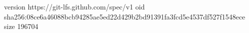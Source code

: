 version https://git-lfs.github.com/spec/v1
oid sha256:08ce6a46088bcb94285ae5ed22d429b2bd91391fa3fcd5e4537df527f1548ece
size 196704
